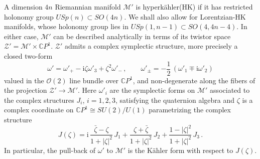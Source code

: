 \documentclass[12pt,reqno]{article}
\numberwithin{equation}{section}
\newcommand{\be}{\begin{equation}}
\newcommand{\ee}{\end{equation}}
\newcommand{\CP}{\IC P^1}
\newcommand{\I}{\mathrm{i}}
\newcommand{\cM}{\mathcal{M}}
\newcommand{\cO}{\mathcal{O}}
\newcommand{\cZ}{\mathcal{Z}}
\newcommand{\IC}{\mathbb{C}}
\newcommand{\kahler}{{K\"ahler}\xspace}
\newcommand{\hk}{{hyperk\"ahler}\xspace}
\def\varpihk{\zeta}
\def\pcM{\cM'}
\def\pcZ{\cZ'}
\def\pomega{\omega'}
\numberwithin{equation}{section}
\begin{document}
A dimension $4n$ Riemannian manifold $\pcM$ is \hk (HK) if it has restricted holonomy group
$USp(n)\subset SO(4n)$. We shall also allow for Lorentzian-HK manifolds, whose holonomy
group lies in $USp(1,n-1)\subset SO(4,4n-4)$. In either case,
$\pcM$ can be described analytically in terms of its twistor space $\pcZ=
\pcM\times \CP$.  $\pcZ$ admits a complex symplectic structure, more precisely a
closed two-form
\be
\pomega=\pomega_+-\I\varpihk \pomega_3+\varpihk^2 \pomega_-\, ,
\qquad
\pomega_\pm=-\frac12\,(\pomega_1\mp\I\pomega_2)
\ee
valued in the $\cO(2)$ line bundle over $\CP$, and
non-degenerate along the fibers of the projection $\pcZ\to\pcM$.
Here $\pomega_i$ are the symplectic forms on $\pcM$ associated to the complex
structures $J_i$, $i=1,2,3$, satisfying the quaternion algebra and $\varpihk$
is a complex coordinate on $\CP\cong SU(2)/U(1)$ parametrizing the complex structure
\be
J(\varpihk) =\I \, \frac{\bar\varpihk-\varpihk}{1+|\varpihk|^2}\, J_1
+\frac{\varpihk+\bar\varpihk}{1+|\varpihk|^2} \, J_2
+\frac{1-|\varpihk|^2}{1+|\varpihk|^2}\, J_3\, .
\label{complexstr}
\ee
In particular, the pull-back of $\pomega$ to $\pcM$
is the \kahler form with respect to $J(\varpihk)$.
\end{document}
